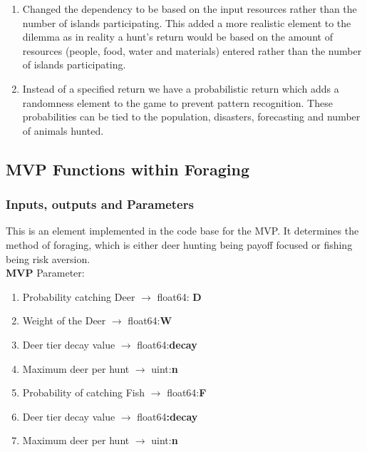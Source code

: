 \begin{enumerate}
    \item Changed the dependency to be based on the input resources rather than the number of islands participating. This added a more realistic element to the dilemma as in reality a hunt’s return would be based on the amount of resources (people, food, water and materials) entered rather than the number of islands participating.
    \item Instead of a specified return we have a probabilistic return which adds a randomness element to the game to prevent pattern recognition. These probabilities can be tied to the population, disasters, forecasting and number of animals hunted.  
\end{enumerate}

\newpage
\subsection{MVP Functions within Foraging}
\subsubsection{Inputs, outputs and Parameters}

This is an element implemented in the code base for the MVP. It determines the method of foraging, which is either deer hunting being payoff focused or fishing being risk aversion.\\

\textbf{MVP }Parameter:

\begin{enumerate}
\item Probability catching Deer $\mathrm{\to}$ float64: \textbf{D}

\item Weight of the Deer $\mathrm{\to}$ float64:\textbf{W}

\item Deer tier decay value $\mathrm{\to}$ float64:\textbf{decay }

\item Maximum deer per hunt $\mathrm{\to}$ uint:\textbf{n}

\item Probability of catching Fish $\mathrm{\to}$ float64:\textbf{F}

\item Deer tier decay value $\mathrm{\to}$ float64\textbf{:decay}

\item Maximum deer per hunt $\mathrm{\to}$ uint:\textbf{n}
\end{enumerate}

